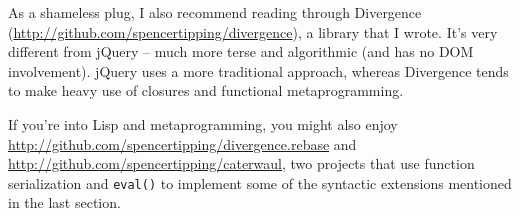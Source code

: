\documentclass{article}
\begin{document}
  As a shameless plug, I also recommend reading through Divergence (\url{http://github.com/spencertipping/divergence}), a library that I wrote. It's very different from jQuery -- much more
  terse and algorithmic (and has no DOM involvement). jQuery uses a more traditional approach, whereas Divergence tends to make heavy use of closures and functional metaprogramming.
  
  If you're into Lisp and metaprogramming, you might also enjoy \url{http://github.com/spencertipping/divergence.rebase} and \url{http://github.com/spencertipping/caterwaul}, two projects that
  use function serialization and \verb|eval()| to implement some of the syntactic extensions mentioned in the last section.
\end{document}

